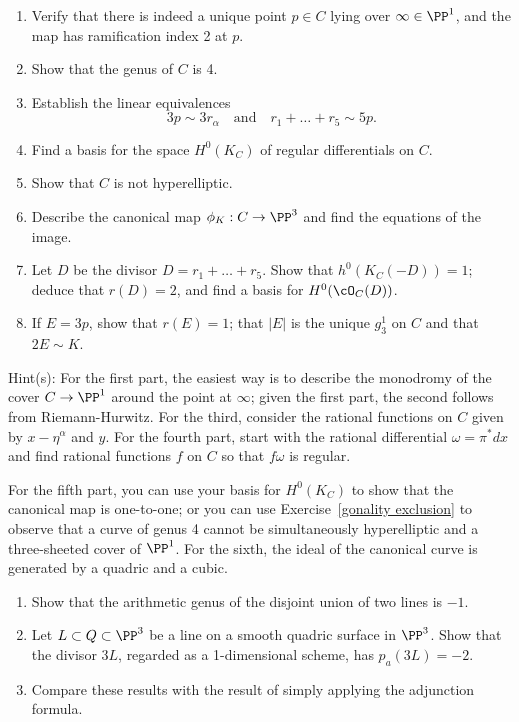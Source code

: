 \begin{exercise}
\begin{enumerate}
\item Verify that there is indeed a unique point $p \in C$ lying over $\infty \in \PP^1$, and the map has ramification index 2 at $p$. 
\item Show that the genus of $C$ is 4.
\item Establish the linear equivalences
$$
3p \sim 3r_\alpha \quad \text{and} \quad r_1+ \dots + r_5 \sim 5p.
$$
\item Find a basis for the space $H^0(K_C)$ of regular differentials on $C$.
\item Show that $C$ is not hyperelliptic.
\item Describe the canonical map $\phi_K : C \to \PP^3$ and find the equations of the image.
\item Let $D$ be the divisor $D = r_1+\dots+r_5$. Show that $h^0(K_C(-D)) = 1$; deduce that $r(D) = 2$, and find a basis for $H^0(\cO_C(D))$.
\item If $E = 3p$, show that $r(E) = 1$; that $|E|$ is the unique $g^1_3$ on $C$ and that $2E \sim K$.
\end{enumerate}
\end{exercise}

Hint(s): For the first part, the easiest way is to describe the monodromy of the cover $C \to \PP^1$ around the point at $\infty$; given the first part, the second follows from Riemann-Hurwitz. For the third, consider the rational functions on $C$ given by $x - \eta^\alpha$ and $y$. For the fourth part, start with the rational differential $\omega = \pi^*dx$ and find rational functions $f$ on $C$ so that $f\omega$ is regular.

For the fifth part, you can use your basis for $H^0(K_C)$ to show that the canonical map is one-to-one; or you can use Exercise~\ref{gonality exclusion} to observe that a curve of genus 4 cannot be simultaneously hyperelliptic and a three-sheeted cover of $\PP^1$. For the sixth, the ideal of the canonical curve is generated by a quadric and a cubic.

\begin{exercise}\label{pa example}
\begin{enumerate}
 \item Show that the arithmetic genus of the disjoint union of two lines is $-1$.
\item Let $L\subset Q\subset \PP^3$ be a line on a smooth quadric surface in $\PP^3$. Show that the 
divisor $3L$, regarded as a 1-dimensional scheme, has $p_a(3L) = -2$.
\item Compare these results with the result of simply applying the adjunction formula.
\end{enumerate}
\end{exercise}


